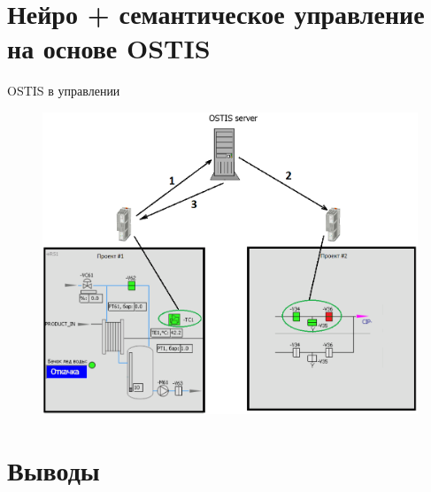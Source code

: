 \documentclass{beamer}
\begin{document}
 \section{Нейро + семантическое управление на основе OSTIS}
 {
    \begin{frame}{OSTIS в управлении}
        \begin{figure}
            \centering
            \includegraphics[width=\textwidth]{images/OSTIS-in-control.png}
        \end{figure}
      \end{frame}
 }

 \section{Выводы}
 {
 }
\end{document}
